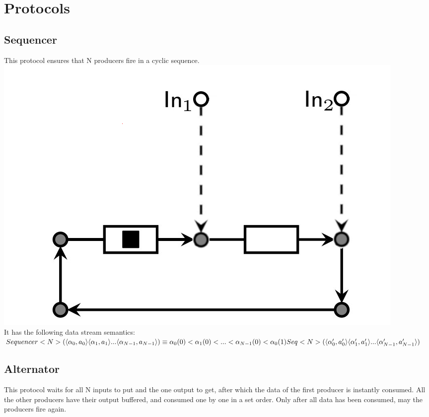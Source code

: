 \section{Protocols}
\subsection{Sequencer}
This protocol ensures that N producers fire in a cyclic sequence.\\

\includegraphics[]{img/seq.png}\\

It has the following data stream semantics:\\
$
Sequencer<N>(\langle \alpha_0, a_0 \rangle \langle \alpha_1, a_1 \rangle... \langle \alpha_{N-1}, a_{N-1} \rangle) \equiv \\
\alpha_0(0) < \alpha_1(0) < ... < \alpha_{N-1}(0) < \alpha_0(1) \\
Seq<N>(\langle \alpha_0', a_0' \rangle \langle \alpha_1', a_1' \rangle... \langle \alpha_{N-1}', a_{N-1}' \rangle)
$


\subsection{Alternator}
This protocol waits for all N inputs to put and the one output to get, after which the data of the first producer is instantly consumed.
All the other producers have their output buffered, and consumed one by one in a set order.
Only after all data has been consumed, may the producers fire again.\\

